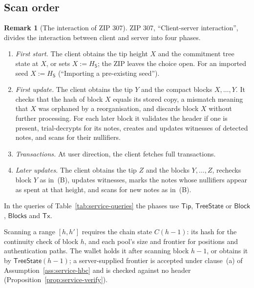 \documentclass[11pt,a4paper]{article}
\theoremstyle{definition}
\newtheorem{remark}[theorem]{Remark}
\begin{document}
\subsection{Scan order}\label{sec:scan-order}

\begin{remark}[The interaction of ZIP 307]
ZIP 307, ``Client-server interaction'', divides the interaction between
client and server into four phases.
\begin{enumerate}[label=(\Alph*)]
\item \emph{First start.} The client obtains the tip height $X$ and the
  commitment tree state at $X$, or sets $X := H_{\mathsf{S}}$; the ZIP
  leaves the choice open. For an imported seed $X := H_{\mathsf{S}}$
  (``Importing a pre-existing seed'').
\item \emph{First update.} The client obtains the tip $Y$ and the compact
  blocks $X, \dots, Y$. It checks that the hash of block $X$ equals its
  stored copy, a mismatch meaning that $X$ was orphaned by a
  reorganisation, and discards block $X$ without further processing. For
  each later block it validates the header if one is present,
  trial-decrypts for its notes, creates and updates witnesses of detected
  notes, and scans for their nullifiers.
\item \emph{Transactions.} At user direction, the client fetches full
  transactions.
\item \emph{Later updates.} The client obtains the tip $Z$ and the blocks
  $Y, \dots, Z$, rechecks block $Y$ as in~(B), updates witnesses, marks the
  notes whose nullifiers appear as spent at that height, and scans for new
  notes as in~(B).
\end{enumerate}
In the queries of Table~\ref{tab:service-queries} the phases use
$\mathsf{Tip}$, $\mathsf{TreeState}$ or $\mathsf{Block}$, $\mathsf{Blocks}$
and $\mathsf{Tx}$.
\end{remark}

Scanning a range $[h, h']$ requires the chain state $C(h - 1)$: its hash
for the continuity check of block $h$, and each pool's size and frontier
for positions and authentication paths. The wallet holds it after scanning
block $h - 1$, or obtains it by $\mathsf{TreeState}(h - 1)$; a
server-supplied frontier is accepted under clause~(a) of
Assumption~\ref{ass:service-hbc} and is checked against no header
(Proposition~\ref{prop:service-verify}).
\end{document}
